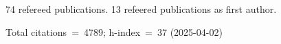 74 refereed publications. 13 refeered publications as first author.

Total citations~=~4789; h-index~=~37 (2025-04-02)